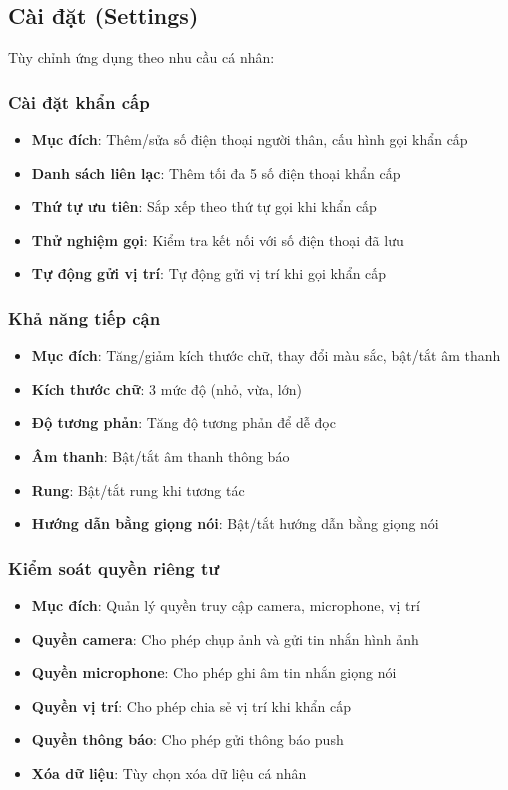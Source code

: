 \documentclass[12pt,a4paper]{article}
\begin{document}
\subsection{Cài đặt (Settings)}
Tùy chỉnh ứng dụng theo nhu cầu cá nhân:

\subsubsection{Cài đặt khẩn cấp}
\begin{itemize}[leftmargin=2cm]
    \item \textbf{Mục đích}: Thêm/sửa số điện thoại người thân, cấu hình gọi khẩn cấp
    \item \textbf{Danh sách liên lạc}: Thêm tối đa 5 số điện thoại khẩn cấp
    \item \textbf{Thứ tự ưu tiên}: Sắp xếp theo thứ tự gọi khi khẩn cấp
    \item \textbf{Thử nghiệm gọi}: Kiểm tra kết nối với số điện thoại đã lưu
    \item \textbf{Tự động gửi vị trí}: Tự động gửi vị trí khi gọi khẩn cấp
\end{itemize}

\subsubsection{Khả năng tiếp cận}
\begin{itemize}[leftmargin=2cm]
    \item \textbf{Mục đích}: Tăng/giảm kích thước chữ, thay đổi màu sắc, bật/tắt âm thanh
    \item \textbf{Kích thước chữ}: 3 mức độ (nhỏ, vừa, lớn)
    \item \textbf{Độ tương phản}: Tăng độ tương phản để dễ đọc
    \item \textbf{Âm thanh}: Bật/tắt âm thanh thông báo
    \item \textbf{Rung}: Bật/tắt rung khi tương tác
    \item \textbf{Hướng dẫn bằng giọng nói}: Bật/tắt hướng dẫn bằng giọng nói
\end{itemize}

\subsubsection{Kiểm soát quyền riêng tư}
\begin{itemize}[leftmargin=2cm]
    \item \textbf{Mục đích}: Quản lý quyền truy cập camera, microphone, vị trí
    \item \textbf{Quyền camera}: Cho phép chụp ảnh và gửi tin nhắn hình ảnh
    \item \textbf{Quyền microphone}: Cho phép ghi âm tin nhắn giọng nói
    \item \textbf{Quyền vị trí}: Cho phép chia sẻ vị trí khi khẩn cấp
    \item \textbf{Quyền thông báo}: Cho phép gửi thông báo push
    \item \textbf{Xóa dữ liệu}: Tùy chọn xóa dữ liệu cá nhân
\end{itemize}
\end{document}
